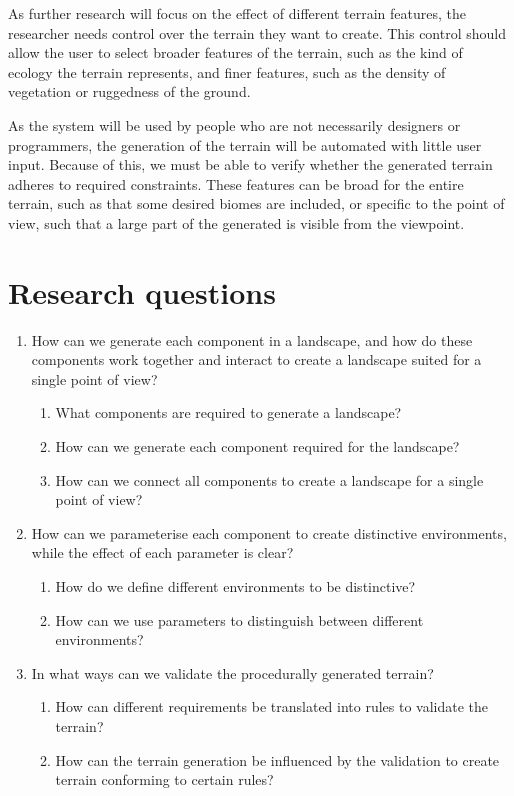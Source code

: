 \documentclass{article}
\begin{document}
As further research will focus on the effect of different terrain features, the researcher needs control over the terrain they want to create. This control should allow the user to select broader features of the terrain, such as the kind of ecology the terrain represents, and finer features, such as the density of vegetation or ruggedness of the ground.

As the system will be used by people who are not necessarily designers or programmers, the generation of the terrain will be automated with little user input. Because of this, we must be able to verify whether the generated terrain adheres to required constraints. These features can be broad for the entire terrain, such as that some desired biomes are included, or specific to the point of view, such that a large part of the generated is visible from the viewpoint.

\section{Research questions}
\begin{enumerate}[label={RQ \arabic*:}]
    \item How can we generate each component in a landscape, and how do these components work together and interact to create a landscape suited for a single point of view?
    \begin{enumerate}[label={RQ 1.\arabic*:}]
        \item What components are required to generate a landscape?
        \item How can we generate each component required for the landscape?
        \item How can we connect all components to create a landscape for a single point of view?
    \end{enumerate}

    \item How can we parameterise each component to create distinctive environments, while the effect of each parameter is clear?
    \begin{enumerate}[label={RQ 2.\arabic*:}]
        \item How do we define different environments to be distinctive?
        \item How can we use parameters to distinguish between different environments?
    \end{enumerate}

    \item In what ways can we validate the procedurally generated terrain?
    \begin{enumerate}[label={RQ 3.\arabic*:}]
        \item How can different requirements be translated into rules to validate the terrain?
        \item How can the terrain generation be influenced by the validation to create terrain conforming to certain rules?
    \end{enumerate}
\end{enumerate}
\end{document}
